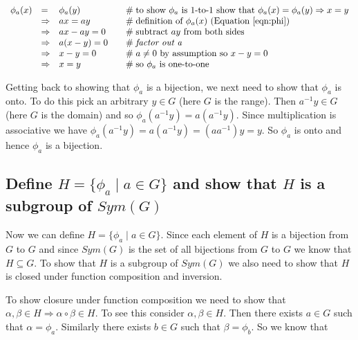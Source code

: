 \documentclass[11pt, oneside]{article}   	%
\theoremstyle{definition}
\begin{document}
\begin{equation*}
\begin{array}{llll}
\phi_{a}(x)  
&=&                 \phi_{a}(y)                         &\quad  \mathrel{\#} \text{to show $\phi_a$ is 1-to-1 show that } \phi_a(x) = \phi_a(y) \Rightarrow x = y \\
&\Rightarrow& ax = ay                            &\quad  \mathrel{\#} \text{definition of $\phi_a(x)$ (\text{Equation \ref{eqn:phi})}}            \\
&\Rightarrow& ax-ay = 0                         &\quad  \mathrel{\#} \text{subtract $ay$ from both sides} \\
&\Rightarrow&  a (x-y) = 0                      &\quad  \mathrel{\#} \textit{factor out a}                            \\
&\Rightarrow&  x - y     = 0                       &\quad  \mathrel{\#} a \neq 0 \text{ by assumption so } x - y = 0  \\
&\Rightarrow&  x = y                               &\quad  \mathrel{\#} \text{so $\phi_{a}$ is one-to-one}
\end{array}
\end{equation*}

\bigskip
\noindent
Getting back to showing that $\phi_{a}$ is a bijection, we next need to show that $\phi_{a}$ is onto. To do this pick an arbitrary $y \in G$ (here $G$ is the range).  
Then $a^{-1}y \in G$ (here $G$ is the domain) and so $\phi_{a}(a^{-1}y) = a(a^{-1}y)$. Since multiplication is associative we have 
$\phi_{a}(a^{-1}y) = a(a^{-1}y) = (aa^{-1})y = y$. So $\phi_{a}$ is onto and hence $\phi_{a}$ is a bijection.
 
 
\subsection{Define $H = \{\phi_{a} \mid a \in G\}$ and show that $H$ is a subgroup of $Sym(G)$}
Now we can define $H = \{\phi_a \mid a \in G\}$. Since each element of $H$ is a bijection from $G$ to $G$ and since $Sym(G)$ is the set of all
bijections from $G$ to $G$ we know that $H \subseteq G$. To show that $H$ is a subgroup of $Sym(G)$ we also need to show that $H$ is closed under function 
composition and  inversion.  

\bigskip
\noindent
To show closure under function composition we need to show that $\alpha, \beta \in H \Rightarrow \alpha \circ \beta \in H$.  To see this consider 
$\alpha, \beta \in H$. Then there exists $a \in G$ such that $\alpha = \phi_{a}$. Similarly there exists $b \in G$ such that $\beta = \phi_b$. So we 
know that
\end{document}
